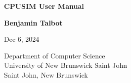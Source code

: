 \begin{titlepage}
    \begin{center}
        \vspace*{1cm}

        \LARGE
        \textbf{CPUSIM User Manual}

        \vspace{0.5cm}
        \Large

        \vspace{2cm}

        \textbf{Benjamin Talbot}
        
        \vspace{0.5cm}
        Dec 6, 2024

        \normalsize
        \vspace{5cm}
        \vspace{0.25cm}

        \vspace{5.5cm}
        Department of Computer Science\\
        University of New Brunswick Saint John\\
        Saint John, New Brunswick\\
        \date{\today}
    \end{center}
\end{titlepage}